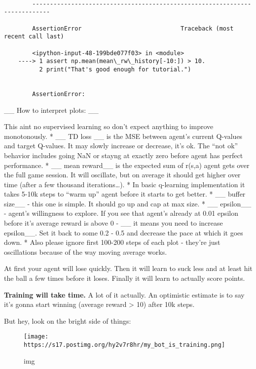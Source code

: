 \documentclass[11pt]{article}
\makeatletter
\def\maxwidth{\ifdim\Gin@nat@width>\linewidth\linewidth
    \else\Gin@nat@width\fi}
\let\Oldincludegraphics\includegraphics
\renewcommand{\includegraphics}[1]{\Oldincludegraphics[width=.8\maxwidth]{#1}}
\makeatother
\begin{document}
    \begin{Verbatim}[commandchars=\\\{\}]

        ---------------------------------------------------------------------------

        AssertionError                            Traceback (most recent call last)

        <ipython-input-48-199bde077f03> in <module>
    ----> 1 assert np.mean(mean\_rw\_history[-10:]) > 10.
          2 print("That's good enough for tutorial.")


        AssertionError: 

    \end{Verbatim}

    \_\_ How to interpret plots: \_\_

This aint no supervised learning so don't expect anything to improve
monotonously. * \_\_ TD loss \_\_ is the MSE between agent's current
Q-values and target Q-values. It may slowly increase or decrease, it's
ok. The ``not ok'' behavior includes going NaN or stayng at exactly zero
before agent has perfect performance. * \_\_ mean reward\_\_ is the
expected sum of r(s,a) agent gets over the full game session. It will
oscillate, but on average it should get higher over time (after a few
thousand iterations\ldots{}). * In basic q-learning implementation it
takes 5-10k steps to ``warm up'' agent before it starts to get better. *
\_\_ buffer size\_\_ - this one is simple. It should go up and cap at
max size. * \_\_ epsilon\_\_ - agent's willingness to explore. If you
see that agent's already at 0.01 epsilon before it's average reward is
above 0 - \_\_ it means you need to increase epsilon\_\_. Set it back to
some 0.2 - 0.5 and decrease the pace at which it goes down. * Also
please ignore first 100-200 steps of each plot - they're just
oscillations because of the way moving average works.

At first your agent will lose quickly. Then it will learn to suck less
and at least hit the ball a few times before it loses. Finally it will
learn to actually score points.

\textbf{Training will take time.} A lot of it actually. An optimistic
estimate is to say it's gonna start winning (average reward
\textgreater{} 10) after 10k steps.

But hey, look on the bright side of things:

\begin{figure}
\centering
\texttt{[image: https://s17.postimg.org/hy2v7r8hr/my\_bot\_is\_training.png]}
\caption{img}
\end{figure}
\end{document}
